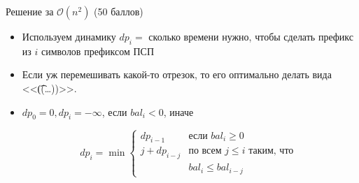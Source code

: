 \begin{frame}{Решение за $\mathcal{O}(n^2)$ (50 баллов)}
  \begin{itemize}
  \item Используем динамику $dp_i=$ сколько времени нужно, чтобы сделать префикс из $i$ символов префиксом ПСП
  \item Если уж перемешивать какой-то отрезок, то его оптимально делать вида <<\t{((\ldots))}>>.
  \item $dp_0 = 0, dp_i = -\infty$, если $bal_i < 0$, иначе

    \[ dp_i = \min \left\{
    \begin{array}{ll}
      dp_{i-1} & \textrm{если } bal_i \geq 0 \\
      j + dp_{i-j} & \textrm{по всем } j \leq i \textrm{ таким, что } \\
      & bal_i \leq bal_{i-j}
    \end{array} \right. \]
  \end{itemize}
\end{frame}

